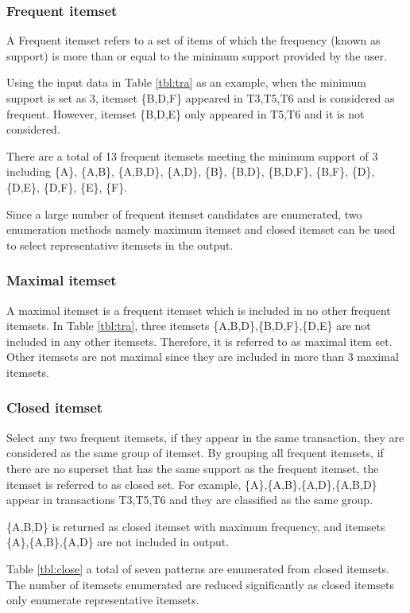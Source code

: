 \subsubsection*{Frequent itemset}
A Frequent itemset refers to a set of items of which the frequency (known as support) is more than or equal to the minimum support provided by the user.

Using the input data in Table \ref{tbl:tra} as an example, when the minimum support is set as 3, itemset \{B,D,F\} appeared in T3,T5,T6 and is considered as frequent. However, itemset \{B,D,E\} only appeared in T5,T6 and it is not considered.

There are a total of 13 frequent itemsets meeting the minimum support of 3 including
\{A\},
\{A,B\},
\{A,B,D\},
\{A,D\},
\{B\},
\{B,D\},
\{B,D,F\},
\{B,F\},
\{D\},
\{D,E\},
\{D,F\},
\{E\},
\{F\}.

Since a large number of frequent itemset candidates are enumerated, two enumeration methods namely maximum itemset and closed itemset can be used to select representative itemsets in the output. 

\subsubsection*{Maximal itemset}
A maximal itemset is a frequent itemset which is included in no other frequent itemsets.  
In Table \ref{tbl:tra}, three itemsets \{A,B,D\},\{B,D,F\},\{D,E\} are not included in any other itemsets. Therefore, it is referred to as maximal item set.
Other itemsets are not maximal since they are included in more than 3 maximal itemsets.

\subsubsection*{Closed itemset}
Select any two frequent itemsets, if they appear in the same transaction, they are considered as the same group of itemset.
By grouping all frequent itemsets, if there are no superset that has the same support as the frequent itemset, the itemset is referred to as closed set.
For example, \{A\},\{A,B\},\{A,D\},\{A,B,D\} appear in transactions T3,T5,T6 and they are classified as the same group.

\{A,B,D\} is returned as closed itemset with maximum frequency, and itemsets \{A\},\{A,B\},\{A,D\} are not included in output. 

Table \ref{tbl:close}  a total of seven patterns are enumerated from closed itemsets. The number of itemsets enumerated are reduced significantly as closed itemsets only enumerate representative itemsets. 

